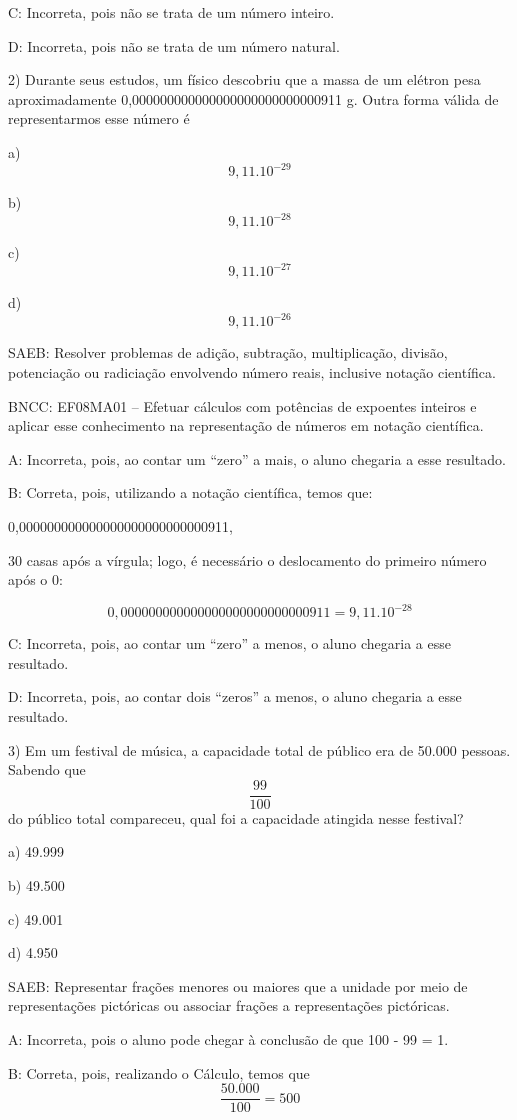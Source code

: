 C: Incorreta, pois não se trata de um número inteiro.

D: Incorreta, pois não se trata de um número natural.

2) Durante seus estudos, um físico descobriu que a massa de um elétron
pesa aproximadamente 0,000000000000000000000000000911 g. Outra forma
válida de representarmos esse número é

a) \[9,11 . 10^{-29}\]

b) \[9,11 . 10^{-28}\]

c) \[ 9,11 . 10^{-27}\]

d) \[9,11 . 10^{-26}\]

SAEB: Resolver problemas de adição, subtração, multiplicação, divisão,
potenciação ou radiciação envolvendo número reais, inclusive notação
científica.

BNCC: EF08MA01 -- Efetuar cálculos com potências de expoentes inteiros e
aplicar esse conhecimento na representação de números em notação
científica.

A: Incorreta, pois, ao contar um ``zero'' a mais, o aluno chegaria a
esse resultado.

B: Correta, pois, utilizando a notação científica, temos que:

0,000000000000000000000000000911,

30 casas após a vírgula; logo, é necessário o deslocamento do primeiro
número após o 0:

\[0,000000000000000000000000000911 = 9,11 . 10^{-28}\]

C: Incorreta, pois, ao contar um ``zero'' a menos, o aluno chegaria a
esse resultado.

D: Incorreta, pois, ao contar dois ``zeros'' a menos, o aluno chegaria a
esse resultado.

3) Em um festival de música, a capacidade total de público era de 50.000
pessoas. Sabendo que \[\frac{99}{100}\] do público total compareceu,
qual foi a capacidade atingida nesse festival?

a) 49.999

b) 49.500

c) 49.001

d) 4.950

SAEB: Representar frações menores ou maiores que a unidade por meio de
representações pictóricas ou associar frações a representações
pictóricas.

A: Incorreta, pois o aluno pode chegar à conclusão de que 100 - 99 = 1.

B: Correta, pois, realizando o Cálculo, temos que
\[ \frac {50.000} {100} = 500\]

